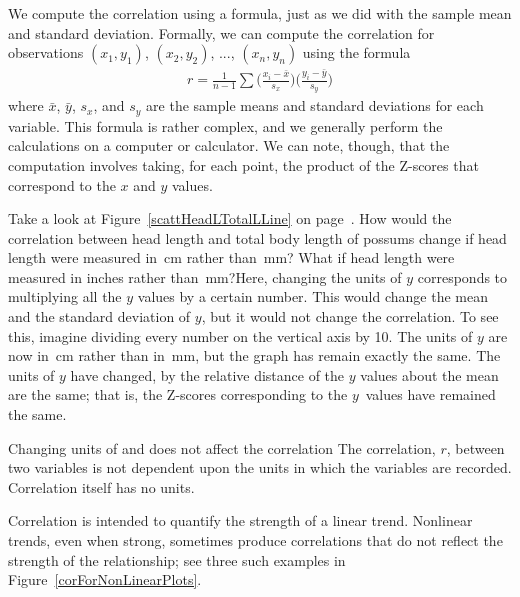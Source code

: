 We compute the correlation using a formula, just as we did with the sample mean and standard deviation. Formally, we can compute the correlation for observations $(x_1, y_1)$, $(x_2, y_2)$, ..., $(x_n, y_n)$ using the formula
\begin{align*}
r =\frac{1}{n-1}\sum{\Big(\frac{x_i-\bar{x}}{s_x}\Big)\Big(\frac{y_i-\bar{y}}{s_y}\Big)}
\end{align*} 
where $\bar{x}$, $\bar{y}$, $s_x$, and $s_y$ are the sample means and standard deviations for each variable.  This formula is rather complex, and we generally perform the calculations on a computer or calculator. We can note, though, that the computation involves taking, for each point, the product of the Z-scores that correspond to the $x$ and $y$ values. 


\begin{examplewrap}
\begin{nexample}
{Take a look at Figure~\ref{scattHeadLTotalLLine} on page~\pageref{scattHeadLTotalLLine}.  How would the correlation between head length and total body length of possums change if head length were measured in~cm rather than~mm?  What if head length were measured in inches rather than~mm?}Here, changing the units of $y$ corresponds to multiplying all the $y$ values by a certain number.  This would change the mean and the standard deviation of $y$, but it would not change the correlation.  To see this, imagine dividing every number on the vertical axis by 10.  The units of $y$ are now in~cm rather than in~mm, but the graph has remain exactly the same.  The units of $y$ have changed, by the relative distance of the $y$ values about the mean are the same; that is, the Z-scores corresponding to the $y$~values have remained the same.
\end{nexample}
\end{examplewrap}

\begin{onebox}{Changing units of  and  does not affect the correlation}
The correlation, $r$, between two variables is not dependent upon the units in which the variables are recorded.  Correlation itself has no units. \end{onebox}



Correlation is intended to quantify the strength of a linear trend. Nonlinear trends, even when strong, sometimes produce correlations that do not reflect the strength of the relationship; see three such examples in Figure~\ref{corForNonLinearPlots}.

